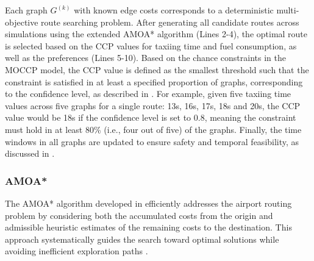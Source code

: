 \documentclass{article}
\begin{document}
Each graph $G^{(k)}$ with known edge costs corresponds to a deterministic multi-objective route searching problem. After generating all candidate routes across simulations using the extended AMOA* algorithm (Lines 2-4), the optimal route is selected based on the CCP values for taxiing time and fuel consumption, as well as the preferences (Lines 5-10). Based on the chance constraints in the MOCCP model, the CCP value is defined as the smallest threshold such that the constraint is satisfied in at least a specified proportion of graphs, corresponding to the confidence level, as described in \cite{wang2021chance}. For example, given five taxiing time values across five graphs for a single route: 13s, 16s, 17s, 18s and 20s, the CCP value would be 18s if the confidence level is set to 0.8, meaning the constraint must hold in at least 80\% (i.e., four out of five) of the graphs. Finally, the time windows in all graphs are updated to ensure safety and temporal feasibility, as discussed in \cite{ravizza2013trade,brownlee2018fuzzy}.

\subsubsection{AMOA*}

The AMOA* algorithm developed in \cite{weiszer2020multi} efficiently addresses the airport routing problem by considering both the accumulated costs from the origin and admissible heuristic estimates of the remaining costs to the destination. This approach systematically guides the search toward optimal solutions while avoiding inefficient exploration paths \cite{mandow2008multiobjective}.
\end{document}
